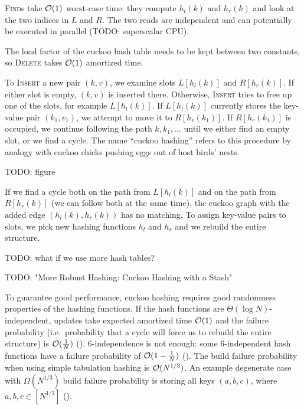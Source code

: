 \textsc{Find}s take $\mathcal{O}(1)$ worst-case time: they compute $h_l(k)$ and $h_r(k)$
and look at the two indices in $L$ and $R$. The two reads are independent and
can potentially be executed in parallel (TODO: superscalar CPU).

The load factor of the cuckoo hash table needs to be kept between two
constants, so \textsc{Delete} takes $\mathcal{O}(1)$ amortized time.

To \textsc{Insert} a new pair $(k,v)$, we examine slots $L[h_l(k)]$ and
$R[h_r(k)]$. If either slot is empty, $(k,v)$ is inserted there. Otherwise,
\textsc{Insert} tries to free up one of the slots, for example $L[h_l(k)]$.
If $L[h_l(k)]$ currently stores the key-value pair $(k_1,v_1)$, we attempt to
move it to $R[h_r(k_1)]$. If $R[h_r(k_1)]$ is occupied, we continue following
the path $k,k_1,\ldots$ until we either find an empty slot, or we find a cycle.
The name ``cuckoo hashing'' refers to this procedure by analogy with
cuckoo chicks pushing eggs out of host birds' nests.

TODO: figure

If we find a cycle both on the path from $L[h_l(k)]$ and on the path from
$R[h_r(k)]$ (we can follow both at the same time), the cuckoo graph with
the added edge $(h_l(k),h_r(k))$ has no matching. To assign key-value pairs
to slots, we pick new hashing functions $h_l$ and $h_r$ and we rebuild
the entire structure.

TODO: what if we use more hash tables?

TODO: "More Robust Hashing: Cuckoo Hashing with a Stash"

To guarantee good performance, cuckoo hashing requires good randomness
properties of the hashing functions.
If the hash functions are $\Theta(\log N)$-independent, updates take expected
amortized time $\mathcal{O}(1)$ and the failure probability (i.e.\ probability that
a cycle will force us to rebuild the entire structure) is $\mathcal{O}(\frac{1}{N})$
(\cite{cuckoo-hashing}).
6-independence is not enough: some 6-independent hash functions have a
failure probability of $\mathcal{O}(1-\frac{1}{N})$ (\cite{cuckoo-hashing-indep-bounds}).
The build failure probability when using simple tabulation hashing is
$\mathcal{O}(N^{1/3})$. An example degenerate case with $\Omega(N^{1/3})$ build
failure probability is storing all keys $(a,b,c)$, where $a,b,c\in[N^{1/3}]$
(\cite{power-of-simple-tab}).

